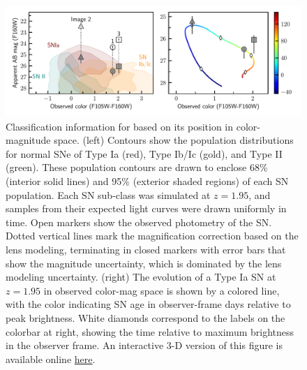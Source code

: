 \documentclass[fleqn,10pt]{wlscirep}
\begin{document}
\begin{figure}
    \centering
    \includegraphics[width=\textwidth]{Paper/Figures/classification_contours_timeline.pdf}
    \caption{Classification information for \SNABC based on its position in color-magnitude space. (left) Contours show the population distributions for normal SNe of Type Ia (red), Type Ib/Ic (gold), and Type II (green).  These population contours are drawn to enclose 68\% (interior solid lines) and 95\% (exterior shaded regions) of each SN population.  Each SN sub-class was simulated at $z=1.95$, and samples from their expected light curves were drawn uniformly in time. Open markers show the observed photometry of the SN. Dotted vertical lines mark the magnification correction based on the lens modeling, terminating in closed markers with error bars that show the magnitude uncertainty, which is dominated by the lens modeling uncertainty.  (right) The evolution of a Type Ia SN at $z=1.95$ in observed color-mag space is shown by a colored line, with the color indicating SN age in observer-frame days relative to peak brightness.  White diamonds correspond to the labels on the colorbar at right, showing the time relative to maximum brightness in the observer frame. An interactive 3-D version of this figure is available online \href{https://plot.ly/~jpierel/6/#/}{here}.
    }
    \label{fig:colormag}
\end{figure}


\end{document}
